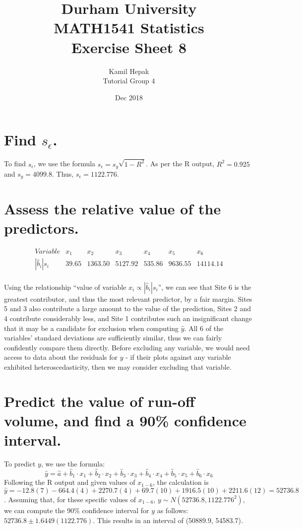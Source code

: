\documentclass[]{article}
\title{\vspace{-2.0cm}Durham University\\
    MATH1541 Statistics \\
	Exercise Sheet 8}
\author{Kamil Hepak\\
        Tutorial Group 4}
\date{Dec 2018}
\begin{document}
\maketitle

\section{Find $s_{\epsilon}$.}
To find $s_{\epsilon}$, we use the formula $s_{\epsilon} = s_{y}\sqrt{1 - R^2}$. As per the R output, $R^2 = 0.925$ and $s_{y} = 4099.8$. Thus, $s_{\epsilon} = 1122.776$.

\section{Assess the relative value of the predictors.}
\begin{displaymath}
    \begin{array}{c|cccccc}
        Variable & x_1 & x_2 & x_3 & x_4 & x_5 & x_6\\
        \hline
        |\hat{b}_i|s_i & 39.65 & 1363.50 & 5127.92 & 535.86 & 9636.55 & 14114.14
        \end{array}    
\end{displaymath}\\
Using the relationship ``value of variable $x_i \propto |\hat{b}_i|s_i$'', we can see that Site 6 is the greatest contributor, and thus the most relevant predictor, by a fair margin. Sites 5 and 3 also contribute a large amount to the value of the prediction, Sites 2 and 4 contribute considerably less, and Site 1 contributes such an insignificant change that it may be a candidate for exclusion when computing $\hat{y}$. All 6 of the variables' standard deviations are sufficiently similar, thus we can fairly confidently compare them directly. Before excluding any variable, we would need access to data about the residuals for $y$ - if their plots against any variable exhibited heteroscedasticity, then we may consider excluding that variable.

\section{Predict the value of run-off volume, and find a 90\% confidence interval.}
To predict $y$, we use the formula:
$$\hat{y} = \hat{a} + \hat{b}_1\cdot x_1 + \hat{b}_2\cdot x_2 + \hat{b}_3\cdot x_3 + \hat{b}_4\cdot x_4 + \hat{b}_5\cdot x_5 + \hat{b}_6\cdot x_6$$
Following the R output and given values of $x_{1-6}$, the calculation is $\hat{y} = -12.8(7) - 664.4(4) + 2270.7(4) + 69.7(10) + 1916.5(10) + 2211.6(12) = 52736.8$.
Assuming that, for these specific values of $x_{1-6}$, $y\sim N(52736.8, 1122.776^2)$, we can compute the 90\% confidence interval for $y$ as follows: $52736.8 \pm 1.6449(1122.776)$. This results in an interval of (50889.9, 54583.7).
\end{document}
